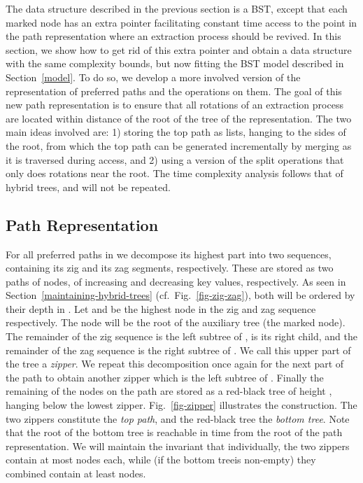 \documentclass[letterpaper,11pt]{article}
\newcommand{\toppath}{top path}
\newcommand{\bottomtree}{bottom tree}
\begin{document}
The data structure described in the previous section is a BST, except that
each marked node has an extra pointer facilitating constant time access to
the point in the path representation where an extraction process should be
revived. In this section, we show how to get rid of this extra pointer and
obtain a data structure with the same complexity bounds, but now fitting
the BST model described in Section~\ref{model}. To do so, we develop a more
involved version of the representation of preferred paths and the
operations on them.
The goal of this new path representation is to ensure that all rotations of
an extraction process are located within distance  of the root of the
tree of the representation. The two main ideas involved are: 1) storing the
\toppath{} as lists,
hanging to the sides of the root, from which 
the \toppath{} can be generated incrementally by merging as it is traversed
during access, and 2) using a version of the split operations that only
does rotations near the root. The time complexity analysis follows that of
hybrid trees, and will not be repeated.

\subsection{Path Representation} For all preferred paths in  we
decompose its highest part
into two sequences, containing its zig and its zag segments,
respectively. These are stored as two paths of nodes, of increasing and
decreasing key values, respectively. As seen in
Section~\ref{maintaining-hybrid-trees} (cf.\ Fig.~\ref{fig-zig-zag}), both
will be ordered by their depth in . Let  and  be the highest
node in the zig and zag sequence respectively. The node  will be the
root of the auxiliary tree (the marked node). The remainder of the zig
sequence is the left subtree of ,  is its right child, and the
remainder of the zag sequence is the right subtree of . We call this
upper part of the tree a \emph{zipper}. We repeat this decomposition once
again for the next part of the path
to obtain another zipper which is the left subtree of . Finally the
remaining of the nodes on the path are stored as a red-black tree of height
, hanging below the lowest zipper. Fig.~\ref{fig-zipper}
illustrates the construction. The two zippers constitute the
\emph{\toppath}, and the red-black tree the \emph{\bottomtree}. Note that
the root of the \bottomtree{} is reachable in  time from the root of
the path representation. We will maintain the invariant that individually,
the two zippers contain at most  nodes each, while (if the
\bottomtree is non-empty) they combined contain at least  nodes.
\end{document}
